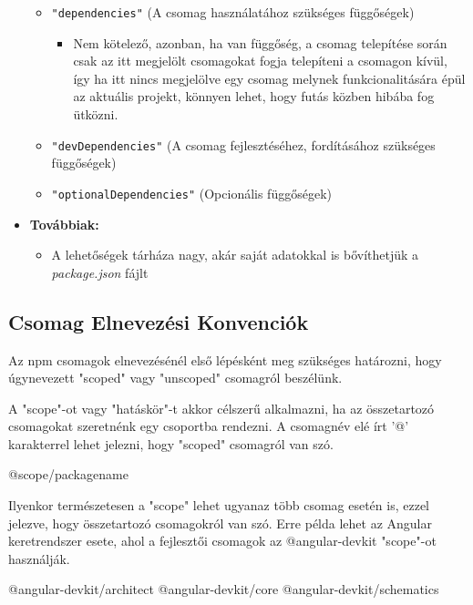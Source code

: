 \begin{itemize}
\begin{itemize}
			\item \texttt{"dependencies"} (A csomag használatához szükséges függőségek)
			\begin{itemize}
				\item Nem kötelező, azonban, ha van függőség, a csomag telepítése során csak az itt megjelölt csomagokat fogja telepíteni a csomagon kívül, így ha itt nincs megjelölve egy csomag melynek funkcionalitására épül az aktuális projekt, könnyen lehet, hogy futás közben hibába fog ütközni.
			\end{itemize}
			\item \texttt{"devDependencies"} (A csomag fejlesztéséhez, fordításához szükséges függőségek)
			\item \texttt{"optionalDependencies"} (Opcionális függőségek)
		\end{itemize}
		\item \textbf{Továbbiak:}
		\begin{itemize}
			\item A lehetőségek tárháza nagy, akár saját adatokkal is bővíthetjük a \emph{package.json} fájlt 
		\end{itemize}
	\end{itemize}

	\begin{flushright}
		\cite{npm-package.json}
	\end{flushright}
	
	\subsection{Csomag Elnevezési Konvenciók}
	
	Az npm csomagok elnevezésénél első lépésként meg szükséges határozni, hogy úgynevezett "scoped" vagy "unscoped" csomagról beszélünk.
	
	A "scope"-ot vagy "hatáskör"-t akkor célszerű alkalmazni, ha az összetartozó csomagokat szeretnénk egy csoportba rendezni. A csomagnév elé írt '@' karakterrel lehet jelezni, hogy "scoped" csomagról van szó.
	
	\begin{cpp}
@scope/packagename
	\end{cpp}

	Ilyenkor természetesen a "scope" lehet ugyanaz több csomag esetén is, ezzel jelezve, hogy összetartozó csomagokról van szó.
	Erre példa lehet az Angular keretrendszer esete, ahol a fejlesztői csomagok az @angular-devkit "scope"-ot használják.
	
	\begin{cpp}
@angular-devkit/architect
@angular-devkit/core
@angular-devkit/schematics
	\end{cpp}

